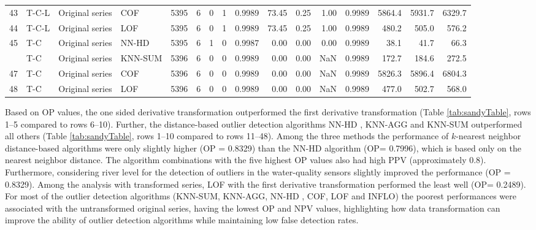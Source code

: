 \documentclass[draft]{agujournal2018} %
\begin{document}
\begin{table}[!htbp]
{\begin{tabular}{rlllrrrrrrrrrrrr}
43 & T-C-L & Original series & COF & 5395 & 6 & 0 & 1 & 0.9989 & 73.45 & 0.25 & 1.00 & 0.9989 & 5864.4 & 5931.7 & 6329.7\\
44 & T-C-L & Original series & LOF & 5395 & 6 & 0 & 1 & 0.9989 & 73.45 & 0.25 & 1.00 & 0.9989 & 480.2 & 505.0 & 576.2\\
45 & T-C & Original series &  \color{black} NN-HD \color{black}  & 5395 & 6 & 1 & 0 & 0.9987 & 0.00 & 0.00 & 0.00 & 0.9989 & 38.1 & 41.7 & 66.3\\
\addlinespace
46 & T-C & Original series & KNN-SUM & 5396 & 6 & 0 & 0 & 0.9989 & 0.00 & 0.00 & NaN & 0.9989 & 172.7 & 184.6 & 272.5\\
47 & T-C & Original series & COF & 5396 & 6 & 0 & 0 & 0.9989 & 0.00 & 0.00 & NaN & 0.9989 & 5826.3 & 5896.4 & 6804.3\\
48 & T-C & Original series & LOF & 5396 & 6 & 0 & 0 & 0.9989 & 0.00 & 0.00 & NaN & 0.9989 & 477.0 & 502.7 & 568.0\\
\bottomrule
\end{tabular}}
\end{table}

Based on OP values, the one sided derivative transformation outperformed
the first derivative transformation (Table \ref{tab:sandyTable}, rows
1--5 compared to rows 6--10). Further, the distance-based outlier detection
algorithms \color{black} NN-HD \color{black}, KNN-AGG and KNN-SUM outperformed all others
(Table \ref{tab:sandyTable}, rows 1--10 compared to rows 11--48). Among
the three methods the performance of \(k\)-nearest neighbor
distance-based algorithms were only slightly higher (OP = 0.8329) than
the \color{black} NN-HD \color{black} algorithm (OP= 0.7996), which is based only on the
nearest neighbor distance. The algorithm combinations with the five
highest OP values also had high PPV (approximately 0.8). Furthermore,
considering river level for the detection of outliers in the
water-quality sensors slightly improved the performance
(OP = 0.8329). Among the analysis with transformed series, LOF with
the first derivative transformation performed the least well
(OP= 0.2489). \color{black} For most of the outlier \color{black} detection algorithms
(KNN-SUM, KNN-AGG, \color{black} NN-HD \color{black}, COF, LOF and INFLO) the poorest
performances were associated with the untransformed original series,
having the lowest OP and NPV values, highlighting how data
transformation can improve the ability of outlier detection algorithms
while maintaining low false detection rates.
\end{document}
